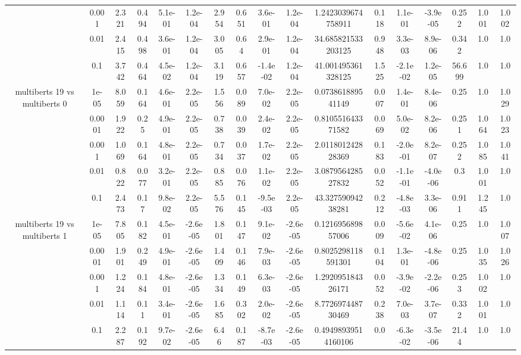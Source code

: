\begin{tabular}{|c|c|c|c|c|c|c|c|c|c|c|c|c|c|c|c|c|}
 & 0.001 & 2.321 & 0.494 & 5.1e-01 & 1.2e-04 & 2.954 & 0.651 & 3.6e-01 & 1.2e-04 & 1.2423039674758911 & 0.118 & 1.1e-01 & -3.9e-05 & 0.252 & 1.001 & 1.002 \\
 & 0.01 & 2.415 & 0.498 & 3.6e-01 & 1.2e-04 & 3.005 & 0.64 & 2.9e-01 & 1.2e-04 & 34.685821533203125 & 0.948 & 3.3e-03 & 8.9e-06 & 0.342 & 1.0 & 1.0 \\
 & 0.1 & 3.742 & 0.464 & 4.5e-02 & 1.2e-04 & 3.119 & 0.657 & -1.4e-02 & 1.2e-04 & 41.001495361328125 & 1.525 & -2.1e-02 & 1.2e-05 & 56.699 & 1.0 & 1.0 \\
\hline
\multirow{5}{*}{multiberts 19 vs multiberts 0} & 1e-05 & 8.059 & 0.164 & 4.6e-01 & 2.2e-05 & 1.556 & 0.089 & 7.0e-02 & 2.2e-05 & 0.073861889541149 & 0.007 & 1.4e-01 & 8.4e-06 & 0.25 & 1.0 & 1.029 \\
 & 0.0001 & 1.922 & 0.25 & 4.9e-01 & 2.2e-05 & 0.738 & 0.039 & 2.4e-02 & 2.2e-05 & 0.810551643371582 & 0.069 & 5.0e-02 & 8.2e-06 & 0.251 & 1.064 & 1.023 \\
 & 0.001 & 1.069 & 0.164 & 4.8e-01 & 2.2e-05 & 0.734 & 0.037 & 1.7e-02 & 2.2e-05 & 2.011801242828369 & 0.183 & -2.0e-01 & 8.2e-07 & 0.252 & 1.085 & 1.041 \\
 & 0.01 & 0.822 & 0.077 & 3.2e-01 & 2.2e-05 & 0.885 & 0.076 & 1.1e-02 & 2.2e-05 & 3.087956428527832 & 0.052 & -1.1e-01 & -4.0e-06 & 0.3 & 1.001 & 1.0 \\
 & 0.1 & 2.473 & 0.17 & 9.8e-02 & 2.2e-05 & 5.576 & 0.145 & -9.5e-03 & 2.2e-05 & 43.32759094238281 & 0.212 & -4.8e-03 & 3.3e-06 & 0.911 & 1.245 & 1.0 \\
\hline
\multirow{5}{*}{multiberts 19 vs multiberts 1} & 1e-05 & 7.805 & 0.182 & 4.5e-01 & -2.6e-05 & 1.801 & 0.147 & 9.1e-02 & -2.6e-05 & 0.121695689857006 & 0.009 & -5.6e-02 & 4.1e-06 & 0.25 & 1.0 & 1.007 \\
 & 0.0001 & 1.901 & 0.249 & 4.9e-01 & -2.6e-05 & 1.409 & 0.146 & 7.9e-03 & -2.6e-05 & 0.8025298118591301 & 0.104 & 1.3e-01 & -4.8e-06 & 0.25 & 1.035 & 1.026 \\
 & 0.001 & 1.224 & 0.184 & 4.8e-01 & -2.6e-05 & 1.334 & 0.149 & 6.3e-03 & -2.6e-05 & 1.292095184326171 & 0.052 & -3.9e-02 & -2.2e-06 & 0.253 & 1.002 & 1.0 \\
 & 0.01 & 1.114 & 0.11 & 3.4e-01 & -2.6e-05 & 1.685 & 0.302 & 2.0e-02 & -2.6e-05 & 8.772697448730469 & 0.238 & 7.0e-03 & 3.7e-07 & 0.332 & 1.001 & 1.0 \\
 & 0.1 & 2.287 & 0.192 & 9.7e-02 & -2.6e-05 & 6.46 & 0.187 & -8.7e-03 & -2.6e-05 & 0.49498939514160106 & 0.0 & -6.3e-02 & -3.5e-06 & 21.44 & 1.0 & 1.0 \\

\end{tabular}
